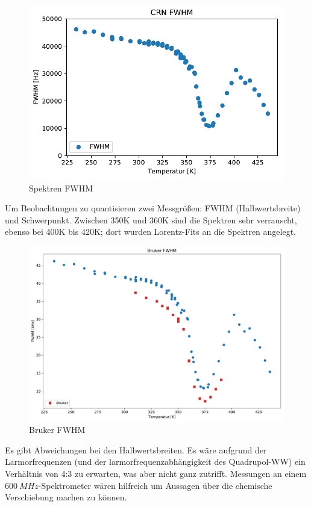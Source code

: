 \begin{figure}
	\begin{center}
		\includegraphics[width=\textwidth]{graphics/plots/SPEK/spek_fwhm.pdf}
	\end{center}
	\caption{Spektren FWHM} \label{fig:res:spek_fwhm}
\end{figure}
Um Beobachtungen zu quantisieren zwei Messgrößen: FWHM (Halbwertsbreite) und Schwerpunkt. Zwischen 350K und 360K sind die Spektren sehr verrauscht, ebenso bei 400K bis 420K; dort wurden Lorentz-Fits an die Spektren angelegt.

\begin{figure}
	\begin{center}
		\includegraphics[width=\textwidth]{graphics/plots/BRUKER/bruker_fwhm.pdf}
	\end{center}
	\caption{Bruker FWHM} \label{fig:res:bruker_fwhm}
\end{figure}
Es gibt Abweichungen bei den Halbwertsbreiten. Es wäre aufgrund der Larmorfrequenzen (und der larmorfrequenzabhängigkeit des Quadrupol-WW) ein Verhältnis von 4:3 zu erwarten, was aber nicht ganz zutrifft. Messungen an einem $\SI{600}{MHz}$-Spektrometer wären hilfreich um Aussagen über die chemische Verschiebung machen zu können.


